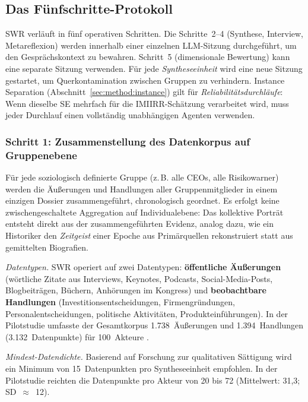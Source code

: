 \documentclass[11pt,a4paper]{article}
\begin{document}
\subsection{Das F\"unfschritte-Protokoll}
\label{sec:method:protocol}

SWR verl\"auft in f\"unf operativen Schritten. Die Schritte~2--4 (Synthese, Interview, Metareflexion) werden innerhalb einer einzelnen LLM-Sitzung durchgef\"uhrt, um den Gespr\"achskontext zu bewahren. Schritt~5 (dimensionale Bewertung) kann eine separate Sitzung verwenden. F\"ur jede \emph{Syntheseeinheit} wird eine neue Sitzung gestartet, um Querkontamination zwischen Gruppen zu verhindern. Instance Separation (Abschnitt~\ref{sec:method:instance}) gilt f\"ur \emph{Reliabilit\"atsdurchl\"aufe}: Wenn dieselbe SE mehrfach f\"ur die IMIIRR-Sch\"atzung verarbeitet wird, muss jeder Durchlauf einen vollst\"andig unabh\"angigen Agenten verwenden.

\subsubsection{Schritt 1: Zusammenstellung des Datenkorpus auf Gruppenebene}

F\"ur jede soziologisch definierte Gruppe (z.\,B. \glqq{}alle CEOs\grqq{}, \glqq{}alle Risikowarner\grqq{}) werden die \"Au\ss{}erungen und Handlungen aller Gruppenmitglieder in einem einzigen Dossier zusammengef\"uhrt, chronologisch geordnet. Es erfolgt keine zwischengeschaltete Aggregation auf Individualebene: Das kollektive Portr\"at entsteht direkt aus der zusammengef\"uhrten Evidenz, analog dazu, wie ein Historiker den \emph{Zeitgeist} einer Epoche aus Prim\"arquellen rekonstruiert statt aus gemittelten Biografien.

\emph{Datentypen.} SWR operiert auf zwei Datentypen: \textbf{\"offentliche \"Au\ss{}erungen} (w\"ortliche Zitate aus Interviews, Keynotes, Podcasts, Social-Media-Posts, Blogbeitr\"agen, B\"uchern, Anh\"orungen im Kongress) und \textbf{beobachtbare Handlungen} (Investitionsentscheidungen, Firmengr\"undungen, Personalentscheidungen, politische Aktivit\"aten, Produkteinf\"uhrungen). In der Pilotstudie umfasste der Gesamtkorpus 1.738~\"Au\ss{}erungen und 1.394~Handlungen (3.132~Datenpunkte) f\"ur 100~Akteure \citep{Geiger2026PaperA}.

\emph{Mindest-Datendichte.} Basierend auf Forschung zur qualitativen S\"attigung \citep{Guest2006, FugardPotts2015} wird ein Minimum von 15~Datenpunkten pro Syntheseeinheit empfohlen. In der Pilotstudie reichten die Datenpunkte pro Akteur von 20 bis 72 (Mittelwert: 31,3; SD~$\approx$~12).
\end{document}
